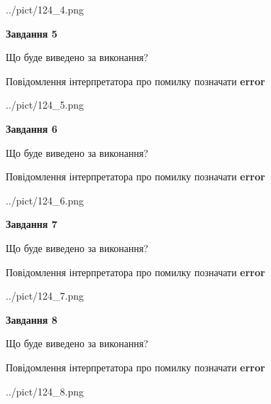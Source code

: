 \documentclass[12pt, ukrainian]{article}
\begin{document}
{\begin{center}
	{../pict/124_4.png}
\end{center}
\newpage

{\begin {center}\textbf{Завдання 5}\end {center}}\par
Що буде виведено за виконання? \par
Повідомлення інтерпретатора про помилку позначати \textbf{error}

\begin{center}
	{../pict/124_5.png}
\end{center}
\newpage

{\begin {center}\textbf{Завдання 6}\end {center}}\par
Що буде виведено за виконання? \par
Повідомлення інтерпретатора про помилку позначати \textbf{error}

\begin{center}
	{../pict/124_6.png}
\end{center}
\newpage

{\begin {center}\textbf{Завдання 7}\end {center}}\par
Що буде виведено за виконання? \par
Повідомлення інтерпретатора про помилку позначати \textbf{error}

\begin{center}
	{../pict/124_7.png}
\end{center}
\newpage

{\begin {center}\textbf{Завдання 8}\end {center}}\par
Що буде виведено за виконання? \par
Повідомлення інтерпретатора про помилку позначати \textbf{error}

\begin{center}
	{../pict/124_8.png}
\end{center}
\newpage

}
\end{document}
